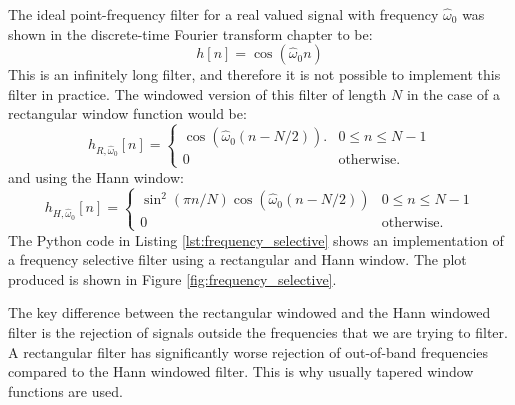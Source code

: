 The ideal point-frequency filter for a real valued signal with frequency
$\hat{\omega}_0$ was shown in the discrete-time Fourier transform
chapter to be:
\begin{equation}
  h[n] = \cos(\hat{\omega}_0 n)
\end{equation}
This is an infinitely long filter, and therefore it is not possible to
implement this filter in practice. The windowed version of this filter
of length $N$ in the case of a rectangular window function would be:
\begin{equation}
h_{R,\hat{\omega}_0}[n] =\left\{ \begin{array}{cc}
\cos(\hat{\omega}_0 (n-N/2)). &   0 \le n \le N-1\\
0 & \mathrm{otherwise}.
\end{array}
\right.
\end{equation}
and using the Hann window:
\begin{equation}
h_{H,\hat{\omega}_0}[n] =\left\{ \begin{array}{cc}
\sin^2(\pi n/N)\cos(\hat{\omega}_0 (n-N/2)) &  0\le n \le N-1\\
0 & \mathrm{otherwise}.
\end{array}
\right.
\end{equation}
The Python code in Listing \ref{lst:frequency_selective} shows an
implementation of a frequency selective filter using a rectangular and
Hann window. The plot produced is shown in Figure
\ref{fig:frequency_selective}.

The key difference between the rectangular windowed and the Hann
windowed filter is the rejection of signals outside the frequencies that
we are trying to filter. A rectangular filter has significantly worse
rejection of out-of-band frequencies compared to the Hann windowed
filter. This is why usually tapered window functions are used.


